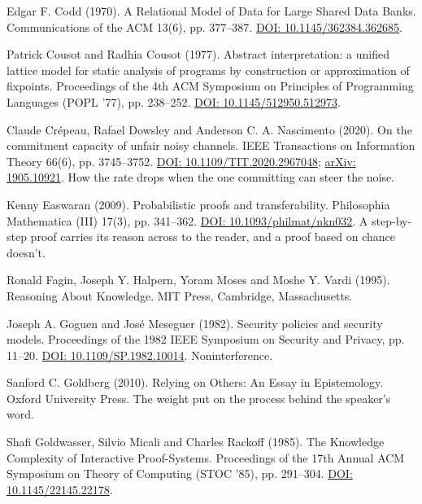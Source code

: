 \noindent Edgar F. Codd (1970). A Relational Model of Data for Large Shared Data Banks. Communications of the ACM 13(6), pp. 377--387. \href{https://doi.org/10.1145/362384.362685}{DOI: 10.1145/362384.362685}.
\par\medskip

\noindent Patrick Cousot and Radhia Cousot (1977). Abstract interpretation: a unified lattice model for static analysis of programs by construction or approximation of fixpoints. Proceedings of the 4th ACM Symposium on Principles of Programming Languages (POPL '77), pp. 238--252. \href{https://doi.org/10.1145/512950.512973}{DOI: 10.1145/512950.512973}.
\par\medskip

\noindent Claude Cr\'epeau, Rafael Dowsley and Anderson C. A. Nascimento (2020). On the commitment capacity of unfair noisy channels. IEEE Transactions on Information Theory 66(6), pp. 3745--3752. \href{https://doi.org/10.1109/TIT.2020.2967048}{DOI: 10.1109/TIT.2020.2967048}; \href{https://arxiv.org/abs/1905.10921}{arXiv: 1905.10921}. How the rate drops when the one committing can steer the noise.
\par\medskip

\noindent Kenny Easwaran (2009). Probabilistic proofs and transferability. Philosophia Mathematica (III) 17(3), pp. 341--362. \href{https://doi.org/10.1093/philmat/nkn032}{DOI: 10.1093/philmat/nkn032}. A step-by-step proof carries its reason across to the reader, and a proof based on chance doesn't.
\par\medskip

\noindent Ronald Fagin, Joseph Y. Halpern, Yoram Moses and Moshe Y. Vardi (1995). Reasoning About Knowledge. MIT Press, Cambridge, Massachusetts.
\par\medskip

\noindent Joseph A. Goguen and Jos\'e Meseguer (1982). Security policies and security models. Proceedings of the 1982 IEEE Symposium on Security and Privacy, pp. 11--20. \href{https://doi.org/10.1109/SP.1982.10014}{DOI: 10.1109/SP.1982.10014}. Noninterference.
\par\medskip

\noindent Sanford C. Goldberg (2010). Relying on Others: An Essay in Epistemology. Oxford University Press. The weight put on the process behind the speaker's word.
\par\medskip

\noindent Shafi Goldwasser, Silvio Micali and Charles Rackoff (1985). The Knowledge Complexity of Interactive Proof-Systems. Proceedings of the 17th Annual ACM Symposium on Theory of Computing (STOC '85), pp. 291--304. \href{https://doi.org/10.1145/22145.22178}{DOI: 10.1145/22145.22178}.
\par\medskip

